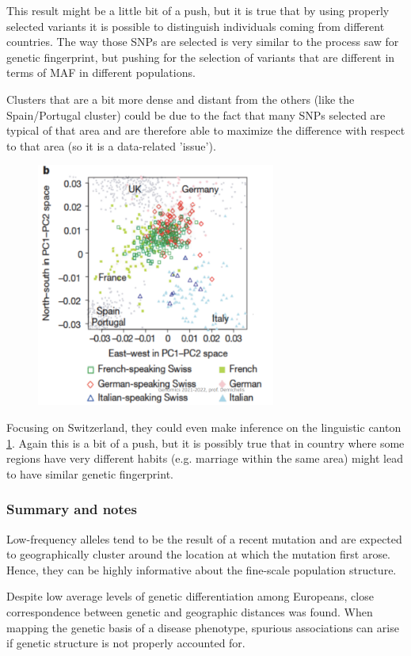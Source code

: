 This result might be a little bit of a push, but it is true that by using properly selected variants it is possible to distinguish individuals coming from different countries. The way those SNPs are selected is very similar to the process saw for genetic fingerprint, but pushing for the selection of variants that are different in terms of MAF in different populations. 

Clusters that are a bit more dense and distant from the others (like the Spain/Portugal cluster) could be due to the fact that many SNPs selected are typical of that area and are therefore able to maximize the difference with respect to that area (so it is a data-related 'issue').

\begin{figure}
	\centering
	\includegraphics[width=0.7\textwidth]{swiss.PNG}
	\caption{\label{fig: PCA_swiss}}
\end{figure}

Focusing on Switzerland, they could even make inference on the linguistic canton \ref*{fig: PCA_swiss}. Again this is a bit of a push, but it is possibly true that in country where some regions have very different habits (e.g. marriage within the same area) might lead to have similar genetic fingerprint. 


\subsubsection{Summary and notes}
Low-frequency alleles tend to be the result of a recent mutation and are expected to geographically cluster around the location at which the mutation first arose. Hence, they can be highly informative about the fine-scale population structure.

Despite low average levels of genetic differentiation among Europeans, close correspondence between genetic and geographic distances was
found. When mapping the genetic basis of a disease phenotype, spurious
associations can arise if genetic structure is not properly accounted for.

